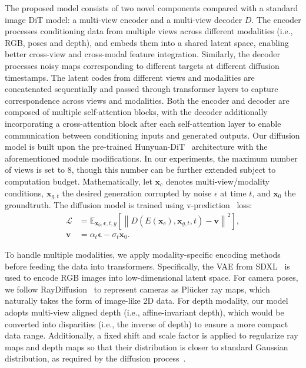 The proposed model consists of two novel components compared with a standard image DiT model: a multi-view encoder and a multi-view decoder $D$. The encoder processes conditioning data from multiple views across different modalities (i.e., RGB, poses and depth), and embeds them into a shared latent space, enabling better cross-view and cross-modal feature integration. Similarly, the decoder processes noisy maps corresponding to different targets at different diffusion timestamps. The latent codes from different views and modalities are concatenated sequentially and passed through transformer layers to capture correspondence across views and modalities. Both the encoder and decoder are composed of multiple self-attention blocks, with the decoder additionally incorporating a cross-attention block after each self-attention layer to enable communication between conditioning inputs and generated outputs. Our diffusion model is built upon the pre-trained Hunyuan-DiT~\cite{li2024hunyuan} architecture with the aforementioned module modifications. In our experiments, the maximum number of views is set to 8, though this number can be further extended subject to computation budget. Mathematically, let $\mathbf{x}_c$ denotes multi-view/modality conditions, $\mathbf{x}_{g,t}$ the desired generation corrupted by noise $\epsilon$ at time $t$, and $\mathbf{x}_0$ the groundtruth. The diffusion model is trained using v-prediction~\cite{salimans2022progressive} loss:
\begin{align}
    \mathcal{L} &= \mathbb{E}_{\mathbf{x}_0, \boldsymbol{\epsilon}, t, y} \left[ \left\| D(E(\mathbf{x}_c), \mathbf{x}_{g,t}, t) - \mathbf{v} \right\|^2 \right], \\
    \mathbf{v} & = \alpha_t \boldsymbol{\epsilon} - \sigma_t \mathbf{x}_0.
\end{align}


 To handle multiple modalities, we apply modality-specific encoding methods before feeding the data into transformers. Specifically, the VAE from SDXL~\cite{podell2023sdxl} is used to encode RGB images into low-dimensional latent space. For camera poses, we follow RayDiffusion~\cite{zhang2024cameras} to represent cameras as Pl\"ucker ray maps, which naturally takes the form of image-like 2D data. For depth modality, our model adopts multi-view aligned depth (i.e., affine-invariant depth), which would be converted into disparities (i.e., the inverse of depth) to ensure a more compact data range. 
Additionally, a fixed shift and scale factor is applied to regularize ray maps and depth maps so that their distribution is closer to standard Gaussian distribution, as required by the diffusion process~\cite{ho2020denoising}.

